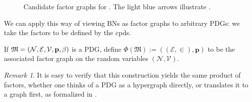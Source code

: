 \documentclass{article}
\theoremstyle{plain}
\theoremstyle{definition}
\theoremstyle{remark}
\newtheorem*{remark}{Remark}
\newcommand\mat[1]{\mathbf{#1}}
\newcommand{\V}{\mathcal V}
\newcommand{\N}{\mathcal N}
\newcommand{\Ed}{\mathcal E}
\newcommand{\dg}[1]{\mathfrak{#1}}
\numberwithin{equation}{section}
\begin{document}
\begin{figure}[htb]
\begin{subfigure}[b]{0.3\linewidth}
{}
			\caption{}\label{subfig:fg-smoking}
		\end{subfigure}%
		\caption{Candidate factor graphs for . The light blue arrows illustrate .}
		\label{fig:fg-intro-examples}
	\end{figure}

	We can apply this way of viewing BNs as factor graphs to arbitrary
	PDGs: we take the factors to be defined by the cpds.
	\begin{defn}
		If $\dg M = \mnvars[]$ is a PDG, define 
		$ \Phi(\dg M) := ((\Ed,\in), \mat p)$
		to be the associated factor graph on the random
				variables $(\N, \V)$. 
	\end{defn}
	\begin{remark}
		It is easy to verify that this construction yields the 
				same product of factors, whether one thinks of a PDG
				as a hypergraph directly, or translates it to a graph
				first, as formalized in . 
	\end{remark}
\end{document}

